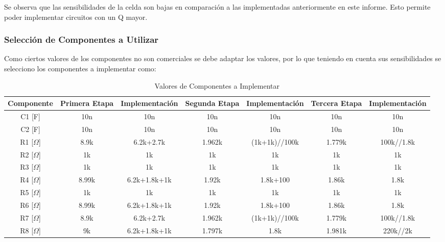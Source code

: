 Se observa que las sensibilidades de la celda son bajas en comparación a las implementadas anteriormente en este informe. Esto permite poder implementar circuitos con un Q mayor. 

\subsubsection{Selección de Componentes a Utilizar}

Como ciertos valores de los componentes no son comerciales se debe adaptar los valores, por lo que teniendo en cuenta sus sensibilidades se selecciono los componentes a implementar como:

\begin{table}[H]
\centering
\begin{tabular}{@{}ccccccc@{}}
\toprule
Componente & Primera Etapa & Implementación & Segunda Etapa & Implementación & Tercera Etapa & Implementación \\ \midrule
C1 [F]         & 10n           & 10n            & 10n           & 10n            & 10n           & 10n            \\
C2 [F]         & 10n           & 10n            & 10n           & 10n            & 10n           & 10n            \\
R1 [$\Omega$]         & 8.9k          & 6.2k+2.7k      & 1.962k        & (1k+1k)//100k  & 1.779k        & 100k//1.8k     \\
R2 [$\Omega$]        & 1k            & 1k             & 1k            & 1k             & 1k            & 1k             \\
R3 [$\Omega$]        & 1k            & 1k             & 1k            & 1k             & 1k            & 1k             \\
R4 [$\Omega$]        & 8.99k         & 6.2k+1.8k+1k   & 1.92k         & 1.8k+100       & 1.86k         & 1.8k           \\
R5 [$\Omega$]        & 1k            & 1k             & 1k            & 1k             & 1k            & 1k             \\
R6 [$\Omega$]        & 8.99k         & 6.2k+1.8k+1k   & 1.92k         & 1.8k+100       & 1.86k         & 1.8k           \\
R7 [$\Omega$]        & 8.9k          & 6.2k+2.7k      & 1.962k        & (1k+1k)//100k  & 1.779k        & 100k//1.8k     \\
R8 [$\Omega$]        & 9k            & 6.2k+1.8k+1k   & 1.797k        & 1.8k           & 1.981k        & 220k//2k       \\ \bottomrule
\end{tabular}
\label{ej4valr}
\caption{Valores de Componentes a Implementar}
\end{table}

